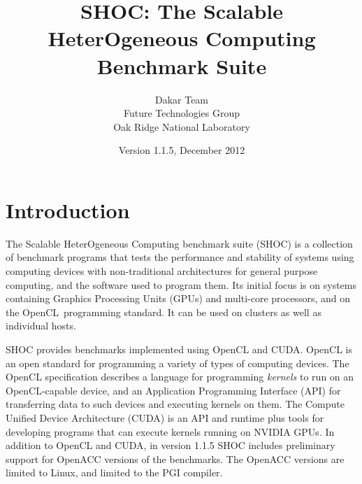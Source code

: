 \documentclass[11pt]{article}
\begin{document}
\title{SHOC: The Scalable HeterOgeneous Computing Benchmark Suite}
\author{Dakar Team\\Future Technologies Group\\Oak Ridge National Laboratory}
\date{Version 1.1.5, December 2012}
\maketitle

\section{Introduction}

The Scalable HeterOgeneous Computing benchmark suite (SHOC) is a collection of
benchmark programs that tests the performance and stability of systems using 
computing devices with non-traditional architectures for general purpose 
computing, and the software used to program them. Its initial focus is on 
systems containing Graphics Processing Units (GPUs) and multi-core 
processors, and on the OpenCL\,\cite{openclspec} programming standard.
It can be used on clusters as well as individual hosts.

SHOC provides benchmarks implemented using OpenCL and CUDA.  
OpenCL is an open standard for programming a variety of types of computing 
devices. The OpenCL specification describes a language for programming 
\emph{kernels} to run on an OpenCL-capable device, and an 
Application Programming Interface (API) for transferring data to such 
devices and executing kernels on them. 
The Compute Unified Device Architecture (CUDA)\cite{cuda} is an API
and runtime plus tools for developing programs that can execute kernels
running on NVIDIA GPUs.
In addition to OpenCL and CUDA, in version 1.1.5 SHOC includes preliminary
support for OpenACC versions of the benchmarks.
The OpenACC versions are limited to Linux, and limited to the PGI compiler.


\end{document}
